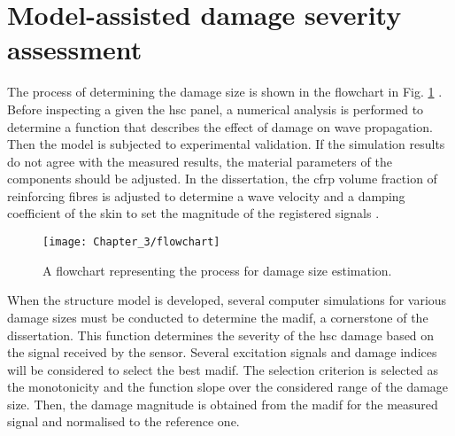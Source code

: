 \section{Model-assisted damage severity assessment}
\label{sec:madif}


The process of determining the damage size is shown in the flowchart in Fig. \ref{fig:Flowchart} \cite{fiborek2021model}.
Before inspecting a given the \ac{hsc} panel, a numerical analysis is performed to determine a function that describes the effect of damage on wave propagation.
Then the model is subjected to experimental validation.
If the simulation results do not agree with the measured results, the material parameters of the components should be adjusted.
In the dissertation, the \ac{cfrp} volume fraction of reinforcing fibres is adjusted to determine a wave velocity \cite{kudela2007modelling} and a damping coefficient of the skin to set the magnitude of the registered signals \cite{wandowski2017guided}.
\begin{figure}[H]
	\begin{center}
		\texttt{[image: Chapter\_3/flowchart]}
	\end{center}
	\caption{A flowchart representing the process for damage size estimation.}
	\label{fig:Flowchart}
\end{figure}

When the structure model is developed, several computer simulations for various damage sizes must be conducted to determine the \ac{madif}, a cornerstone of the dissertation. This function determines the severity of the \ac{hsc} damage based on the signal received by the sensor.
Several excitation signals and damage indices will be considered to select the best \ac{madif}.
The selection criterion is selected as the monotonicity and the function slope over the considered range of the damage size. Then, the damage magnitude is obtained from the \ac{madif} for the measured signal and normalised to the reference one.


